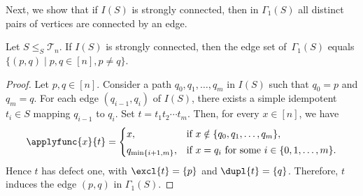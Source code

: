 Next, we show that if
$I(S)$ is strongly connected, then in $\Gamma_1(S)$ all distinct pairs of vertices 
are connected by an edge.

\begin{proposition}
	\label{sync_max:prop:Gamma1alledges}
	Let $S \le_S \mathcal T_n$.
	If $I(S)$ is strongly connected,
	then the edge set of~$\Gamma_1(S)$ 
	equals $\{ (p,q) \mid p,q \in [n], p \ne q \}$.
\end{proposition}
\begin{proof}
	Let $p,q \in [n]$.
	Consider a path
	$
	q_0, q_1, \ldots, q_m
	$
	in $I(S)$ such that $q_0 = p$ and $q_m = q$.
	For each edge $(q_{i-1}, q_i)$ of $I(S)$,
	there exists a simple idempotent $t_i \in S$
	mapping $q_{i-1}$ to $q_i$.
	Set
	$
	t = t_1 t_2 \cdots t_m.
	$
	Then, for every $x \in [n]$, we have
	\[
	\applyfunc{x}{t}
	=
	\begin{cases}
		x,
		& \text{if } x \notin \{q_0, q_1, \ldots, q_m\}, \\[0.5ex]
		q_{\min\{i+1,m\}},
		& \text{if } x = q_i
		\text{ for some } i \in \{0,1,\ldots,m\}.
	\end{cases}
	\]
	Hence $t$ has defect one, with
	$\excl{t} = \{p\}$ and
	$\dupl{t} = \{q\}$.
	Therefore, $t$ induces the edge $(p,q)$ in $\Gamma_1(S)$.
\end{proof}